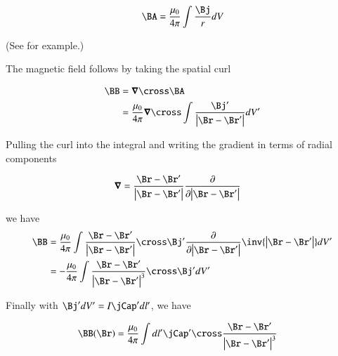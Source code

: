\begin{align*}
\BA = \frac{\mu_0}{4 \pi} \int \frac{\Bj}{r} dV
\end{align*}

(See \cite{schwartz1987pe} for example.)

The magnetic field follows by taking the spatial curl

\begin{align*}
\BB
&= \spacegrad \cross \BA \\
&= \frac{\mu_0}{4 \pi} \spacegrad \cross \int \frac{\Bj'}{\Abs{\Br-\Br'}} dV'
\end{align*}

Pulling the curl into the integral and writing the gradient in terms of radial components

\begin{align*}
\spacegrad &= \frac{\Br - \Br'}{\Abs{\Br - \Br'}} \PD{\Abs{\Br - \Br'}}{}
\end{align*}

we have
\begin{align*}
\BB
&= \frac{\mu_0}{4 \pi} \int
\frac{\Br - \Br'}{\Abs{\Br - \Br'}} \cross \Bj' \PD{\Abs{\Br - \Br'}}{}{\inv{ \Abs{\Br-\Br'} }} dV' \\
&= -\frac{\mu_0}{4 \pi} \int
\frac{\Br - \Br'}{\Abs{\Br - \Br'}^3} \cross \Bj' dV' \\
\end{align*}

Finally with $\Bj' dV' = I \jCap' dl'$, we have

\begin{align}
\BB(\Br) &= \frac{\mu_0}{4 \pi} \int dl' \jCap' \cross \frac{\Br - \Br'}{\Abs{\Br - \Br'}^3}
\end{align}
